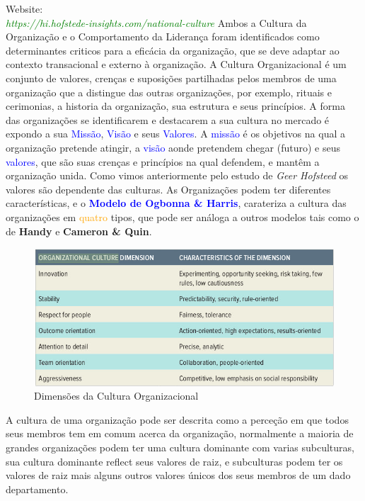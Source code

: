 Website:\\
\textit{\textcolor{green}{https://hi.hofstede-insights.com/national-culture}}
\emptyline
Ambos a Cultura da Organização e o Comportamento da Liderança foram identificados como determinantes criticos para a eficácia da organização, que se deve adaptar ao contexto transacional e externo à organização. A Cultura Organizacional é um conjunto de valores, crenças e suposições partilhadas pelos membros de uma organização que a distingue das outras organizações, por exemplo, rituais e cerimonias, a historia da organização, sua estrutura e seus princípios.\cite{book_9}
\emptyline
A forma das organizações se identificarem e destacarem a sua cultura no mercado é expondo a sua \textcolor{blue}{Missão}, \textcolor{blue}{Visão} e seus \textcolor{blue}{Valores}.
\emptyline
A \textcolor{blue}{missão} é os objetivos na qual a organização pretende atingir, a \textcolor{blue}{visão} aonde pretendem chegar (futuro) e seus \textcolor{blue}{valores}, que são suas crenças e princípios na qual defendem, e mantêm a organização unida. Como vimos anteriormente pelo estudo de \textit{Geer Hofsteed} os valores são dependente das culturas.
\emptyline
As Organizações podem ter diferentes características, e o \textcolor{blue}{\textbf{Modelo de Ogbonna \& Harris}}, carateriza a cultura das organizações em \textcolor{orange}{quatro} tipos, que pode ser análoga a outros modelos tais como o de \textbf{Handy} e \textbf{Cameron \& Quin}.
\begin{figure}[H]
\flushleft
\captionsetup{justification=raggedright,singlelinecheck=false}
\includegraphics[scale=0.4]{./image/OB/OC_Dimensions.jpg}
\caption{Dimensões da Cultura Organizacional \cite{book_4}}
\end{figure}
A cultura de uma organização pode ser descrita como a perceção em que todos seus membros tem em comum acerca da organização, normalmente a maioria de grandes organizações podem ter uma cultura dominante com varias subculturas, sua cultura dominante reflect seus valores de raiz, e subculturas podem ter os valores de raiz mais alguns outros valores únicos dos seus membros de um dado departamento. \\
